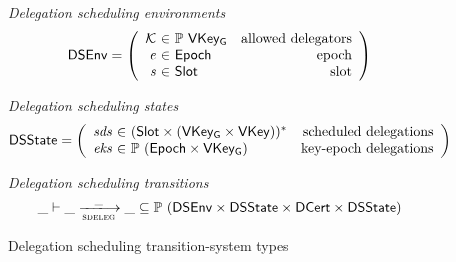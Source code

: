 \begin{figure}[htb]
  \emph{Delegation scheduling environments}
  \begin{equation*}
    \DSEnv =
    \left(
      \begin{array}{r@{~\in~}lr}
        \mathcal{K} & \powerset{\VKeyGen} & \text{allowed delegators}\\
        \var{e} & \Epoch & \text{epoch}\\
        \var{s} & \Slot & \text{slot}\\
      \end{array}
    \right)
  \end{equation*}

  \emph{Delegation scheduling states}
  \begin{equation*}
    \DSState
    = \left(
      \begin{array}{r@{~\in~}lr}
        \var{sds} & \seqof{(\Slot \times (\VKeyGen \times \VKey))} & \text{scheduled delegations}\\
        \var{eks} & \powerset{(\Epoch \times \VKeyGen)} & \text{key-epoch delegations}
      \end{array}
    \right)
  \end{equation*}

  \emph{Delegation scheduling transitions}
  \begin{equation*}
    \var{\_} \vdash
    \var{\_} \trans{sdeleg}{\_} \var{\_}
    \subseteq \powerset (\DSEnv \times \DSState \times \DCert \times \DSState)
  \end{equation*}
  \caption{Delegation scheduling transition-system types}
  \label{fig:ts-types:delegation-scheduling}
\end{figure}


